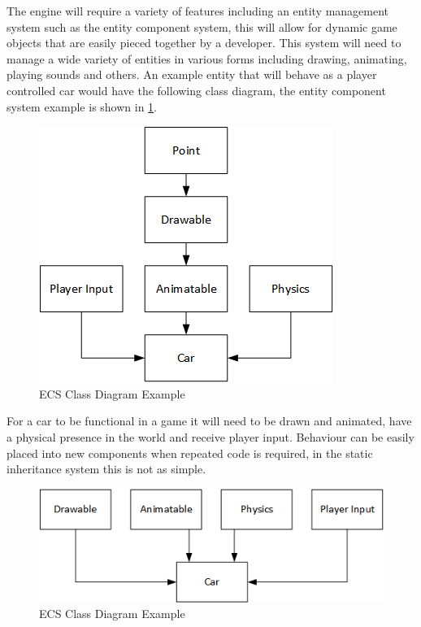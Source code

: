 \documentclass[11pt,a4paper,titlepage]{article}
\begin{document}
	The engine will require a variety of features including an entity management system such as the entity component system, this will allow for dynamic game objects that are easily pieced together by a developer. This system will need to manage a wide variety of entities in various forms including drawing, animating, playing sounds and others. An example entity that will behave as a player controlled car would have the following class diagram, the entity component system example is shown in \ref{fig:ClassDiagram1}.

	\begin{figure}[h] 
		\centering
		\includegraphics[scale=0.75]{ECS1}
		\caption{ECS Class Diagram Example}
		\label{fig:ClassDiagram1}
	\end{figure}

	For a car to be functional in a game it will need to be drawn and animated, have a physical presence in the world and receive player input. Behaviour can be easily placed into new components when repeated code is required, in the static inheritance system this is not as simple.

	\begin{figure}[h]
		\centering
		\includegraphics[scale=0.75]{ECS2}
		\caption{ECS Class Diagram Example}
		\label{fig:ClassDiagram2}
	\end{figure}
\end{document}
